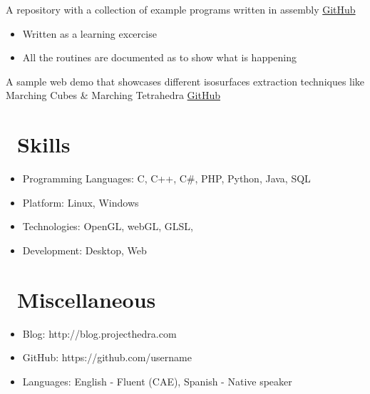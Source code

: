 \documentclass{resume}
\begin{document}
A repository with a collection of example programs written in assembly
\href {https://github.com/maxilevi/asm-examples}{GitHub}
\begin{itemize}
  \item Written as a learning excercise
  \item All the routines are documented as to show what is happening
\end{itemize}


A sample web demo that showcases different isosurfaces extraction techniques like Marching Cubes \& Marching Tetrahedra
\href {https://github.com/maxilevi/isosurface}{GitHub}


\section{\faCogs\ Skills}
\begin{itemize}[parsep=0.5ex]
  \item Programming Languages: C, C++, C\#, PHP, Python, Java, SQL
  \item Platform: Linux, Windows
  \item Technologies: OpenGL, webGL, GLSL,
  \item Development: Desktop, Web
\end{itemize}


\section{\faInfo\ Miscellaneous}
\begin{itemize}[parsep=0.5ex]
  \item Blog: http://blog.projecthedra.com
  \item GitHub: https://github.com/username
  \item Languages: English - Fluent (CAE), Spanish - Native speaker
\end{itemize}
\end{document}
